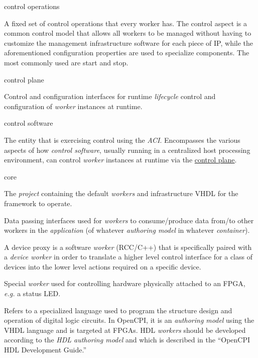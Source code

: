 \documentclass[10pt, a4paper, oneside]{article}
\renewcommand\_{\textunderscore\allowbreak} %
\begin{document}
\begin{description}[style=nextline]
\item [\emph{Control Operations}] \hypertarget{control operations}{control operations}
A fixed set of control operations that every worker has. The control aspect is a common control model that allows all workers to be managed without having to customize the management infrastructure software for each piece of IP, while the aforementioned configuration properties are used to specialize components. The most commonly used are start and stop.

\item[Control Plane]\hypertarget{control plane}{control plane}
Control and configuration interfaces for runtime \textit{lifecycle} control and configuration of \textit{worker} instances at runtime.

\item[Control Software (Control Agent)] \hypertarget{control software}{control software}
The entity that is exercising control using the \textit{ACI}. Encompasses the various aspects of how \textit{control software}, usually running in a centralized host processing environment, can control \textit{worker} instances at runtime via the \hyperlink{control plane}{control plane}.

\item[Core] \hypertarget{core}{core}
The \textit{project} containing the default \textit{workers} and infrastructure VHDL for the framework to operate.

\item[Data Plane]
Data passing interfaces used for \textit{workers} to consume/produce data from/to other workers in the \textit{application} (of whatever \textit{authoring model} in whatever \textit{container}).

\item[Device Proxy]
A device proxy is a software \textit{worker} (RCC/C++) that is specifically paired with a \textit{device worker} in order to translate a higher level control interface for a class of devices into the lower level actions required on a specific device.

\item[Device Worker]
Special \textit{worker} used for controlling hardware physically attached to an FPGA, \textit{e.g.} a status LED.

\item[Hardware Description Language]
Refers to a specialized language used to program the structure design and operation of digital logic circuits. In OpenCPI, it is an \textit{authoring model} using the VHDL language and is targeted at FPGAs. HDL \textit{workers} should be developed according to the \textit{HDL authoring model} and which is described in the ``OpenCPI HDL Development Guide.''


\end{description}
\end{document}
